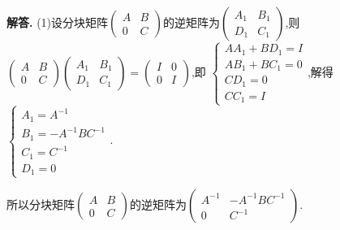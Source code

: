 \documentclass[12pt, a4paper, oneside]{ctexart}
\newenvironment{solution}{\par\noindent\textbf{解答. }}{\par}
\begin{document}
\begin{solution}
    (1)设分块矩阵$
    \begin{pmatrix}
        A & B \\
        0 & C
    \end{pmatrix}
    $的逆矩阵为$
    \begin{pmatrix}
        A_1 & B_1 \\
        D_1 & C_1
    \end{pmatrix}
    $,则$
    \begin{pmatrix}
        A & B \\
        0 & C
    \end{pmatrix}
    \begin{pmatrix}
        A_1 & B_1 \\
        D_1 & C_1
    \end{pmatrix}=
    \begin{pmatrix}
        I & 0 \\
        0 & I
    \end{pmatrix}
    $,即
    $
    \begin{cases}
        AA_1+BD_1=I \\
        AB_1+BC_1=0 \\
        CD_1=0 \\
        CC_1=I
    \end{cases}
    $,解得
    $
    \begin{cases}
        A_1=A^{-1} \\
        B_1= -A^{-1}BC^{-1} \\
        C_1=C^{-1} \\
        D_1=0
    \end{cases}
    $.

    所以分块矩阵$
    \begin{pmatrix}
        A & B \\
        0 & C
    \end{pmatrix}
    $的逆矩阵为$
    \begin{pmatrix}
        A^{-1} & -A^{-1}BC^{-1} \\
        0 & C^{-1} 
    \end{pmatrix}
    $.


\end{solution}
\end{document}
